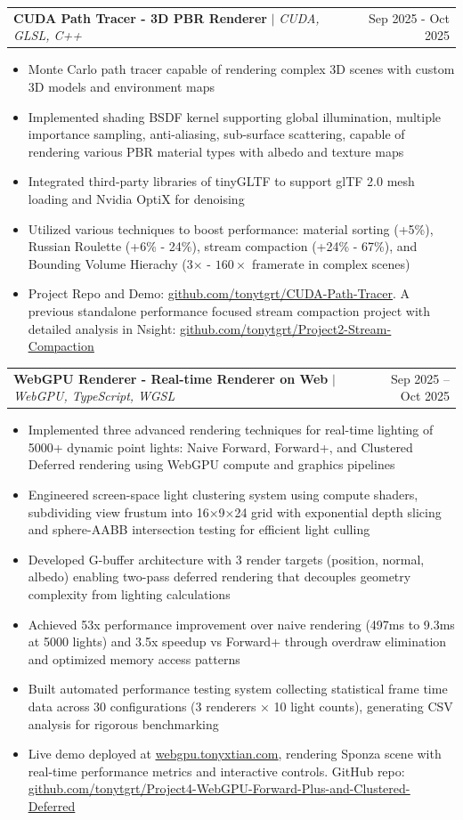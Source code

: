 \documentclass[letterpaper,11pt]{article}
\makeatletter
\newcommand{\resumeItem}[1]{
  \item\small{
    {#1 \vspace{-3pt}}
  }
}
\newcommand{\resumeProjectHeading}[2]{
    \item
    \begin{tabular*}{0.97\textwidth}{l@{\extracolsep{\fill}}r}
      \small#1 & #2 \\
    \end{tabular*}\vspace{-7pt}
}
\newcommand{\resumeItemListStart}{\begin{itemize}}
\newcommand{\resumeItemListEnd}{\end{itemize}\vspace{-5pt}}
\makeatother
\begin{document}
\resumeProjectHeading
  {\textbf{CUDA Path Tracer - 3D PBR Renderer} $|$ \emph{CUDA, GLSL, C++}}{Sep 2025 - Oct 2025}
  \resumeItemListStart
  \resumeItem{Monte Carlo path tracer capable of rendering complex 3D scenes with custom 3D models and environment maps}
  \resumeItem{Implemented shading BSDF kernel supporting global illumination, multiple importance sampling, anti-aliasing, sub-surface scattering, capable of rendering various PBR material types with albedo and texture maps}
  \resumeItem{Integrated third-party libraries of tinyGLTF to support glTF 2.0 mesh loading and Nvidia OptiX for denoising}
  \resumeItem{Utilized various techniques to boost performance: material sorting (+5\%), Russian Roulette (+6\% - 24\%), stream compaction (+24\% - 67\%), and Bounding Volume Hierachy (3$\times$ - $160\times$ framerate in complex scenes) }
  \resumeItem{Project Repo and Demo: \href{https://github.com/tonytgrt/CUDA-Path-Tracer}{\uline{github.com/tonytgrt/CUDA-Path-Tracer}}. A previous standalone performance focused stream compaction project with detailed analysis in Nsight: \href{https://github.com/tonytgrt/Project2-Stream-Compaction}{\uline{github.com/tonytgrt/Project2-Stream-Compaction}}}
\resumeItemListEnd

\resumeProjectHeading
      {\textbf{WebGPU Renderer - Real-time Renderer on Web} $|$ \emph{WebGPU, TypeScript, WGSL}}{Sep 2025 -- Oct 2025}
      \resumeItemListStart
      \resumeItem{Implemented three advanced rendering techniques for real-time lighting of 5000+ dynamic point lights: Naive Forward, Forward+, and Clustered Deferred rendering using WebGPU compute and graphics pipelines}
      \resumeItem{Engineered screen-space light clustering system using compute shaders, subdividing view frustum into 16×9×24 grid with exponential depth slicing and sphere-AABB intersection testing for efficient light culling}
      \resumeItem{Developed G-buffer architecture with 3 render targets (position, normal, albedo) enabling two-pass deferred rendering that decouples geometry complexity from lighting calculations}
      \resumeItem{Achieved 53x performance improvement over naive rendering (497ms to 9.3ms at 5000 lights) and 3.5x speedup vs Forward+ through overdraw elimination and optimized memory access patterns}
      \resumeItem{Built automated performance testing system collecting statistical frame time data across 30 configurations (3 renderers × 10 light counts), generating CSV analysis for rigorous benchmarking}
      \resumeItem{Live demo deployed at \href{http://webgpu.tonyxtian.com}{\uline{webgpu.tonyxtian.com}}, rendering Sponza scene with real-time performance metrics and interactive controls. GitHub repo: \href{https://github.com/tonytgrt/Project4-WebGPU-Forward-Plus-and-Clustered-Deferred}{\uline{github.com/tonytgrt/Project4-WebGPU-Forward-Plus-and-Clustered-Deferred}}}
      \resumeItemListEnd
    
\end{document}
